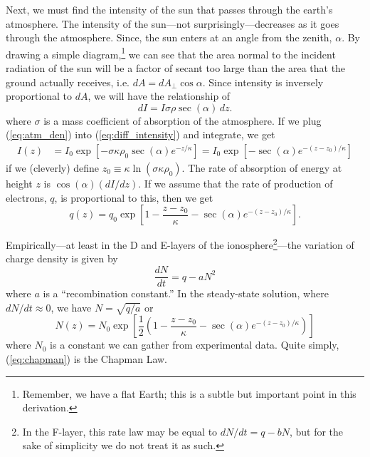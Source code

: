 \documentclass[11pt]{article}
\numberwithin{equation}{section}
\begin{document}
    Next, we must find the intensity of the sun that passes through the earth's atmosphere. The intensity of the sun---not surprisingly---decreases as it goes through the atmosphere.\cite{budden1961radio} Since, the sun enters at an angle from the zenith, $\alpha$. By drawing a simple diagram,\footnote{Remember, we have a flat Earth; this is a subtle but important point in this derivation.} we can see that the area normal to the incident radiation of the sun will be a factor of secant too large than the area that the ground actually receives, i.e. $dA = dA_\perp \cos\alpha.$ Since intensity is inversely proportional to $dA$, we will have the relationship of 
    \begin{equation}
        dI = I \sigma \rho \sec(\alpha) \, dz.
        \label{eq:diff_intensity}
    \end{equation}
    where $\sigma$ is a mass coefficient of absorption of the atmosphere. If we plug (\ref{eq:atm_den}) into (\ref{eq:diff_intensity}) and integrate, we get
    \begin{align}
        I(z)&= I_0 \exp\left[ -\sigma \kappa  \rho_0 \sec(\alpha) e^{- z/\kappa}\right] = I_0 \exp\left[ - \sec(\alpha) e^{- (z - z_0)/\kappa}\right]
        \label{eq:inten_v_height}
    \end{align}
    if we (cleverly) define $z_0 \equiv \kappa \ln \left(\sigma \kappa  \rho_0\right)$. The rate of absorption of energy at height $z$ is $\cos(\alpha)(dI/dz)$. If we assume that the rate of production of electrons, $q$, is proportional to this, then we get 
    \begin{equation}
        q(z) = q_0 \exp\left[1 - \frac{z-z_0}{\kappa} - \sec(\alpha) e^{- (z - z_0)/\kappa}\right].
        \label{eq:rate_prod_elec}
    \end{equation}

    Empirically---at least in the D and E-layers of the ionosphere\footnote{In the F-layer, this rate law may be equal to $dN/dt = q - b N$, but for the sake of simplicity we do not treat it as such.}---the variation of charge density is given by\cite{budden1961radio}
    \begin{equation}
        \frac{dN}{dt} = q - a N^2
        \label{eq:charge_den_rate}
    \end{equation}
    where $a$ is a ``recombination constant.'' In the steady-state solution, where $dN/dt \approx 0$, we have $N = \sqrt{q/a}$ or
    \begin{equation}
        N(z) = N_0 \exp\left[\frac12\left(1 - \frac{z-z_0}{\kappa} - \sec(\alpha) e^{- (z - z_0)/\kappa}\right)\right]
        \label{eq:chapman}
    \end{equation}
    where $N_0$ is a constant we can gather from experimental data. Quite simply, (\ref{eq:chapman}) is the Chapman Law.\cite{chapman1931a,chapman1931b,budden1961radio,budden1988propagation}
\end{document}
